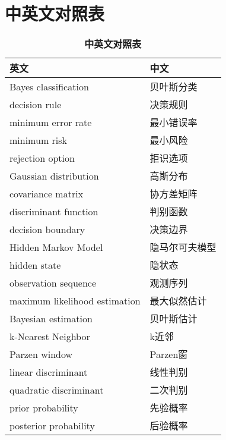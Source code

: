 \documentclass[UTF8]{report}
\theoremstyle{MyLineTheoremStyle} %
\theoremstyle{MyBlockTheoremStyle} %
\theoremstyle{MySubsubsectionStyle} %
\begin{document}
\section{中英文对照表}
\begin{multicols}{2}  

\begin{table}[H]
\centering
\caption{\textbf{中英文对照表}}
\begin{tabular}{ll}
\toprule
英文 & 中文 \\
\midrule
Bayes classification & 贝叶斯分类 \\
decision rule & 决策规则 \\
minimum error rate & 最小错误率 \\
minimum risk & 最小风险 \\
rejection option & 拒识选项 \\
Gaussian distribution & 高斯分布 \\
covariance matrix & 协方差矩阵 \\
discriminant function & 判别函数 \\
decision boundary & 决策边界 \\
Hidden Markov Model & 隐马尔可夫模型 \\
hidden state & 隐状态 \\
observation sequence & 观测序列 \\
maximum likelihood estimation & 最大似然估计 \\
Bayesian estimation & 贝叶斯估计 \\
k-Nearest Neighbor & k近邻 \\
Parzen window & Parzen窗 \\
linear discriminant & 线性判别 \\
quadratic discriminant & 二次判别 \\
prior probability & 先验概率 \\
posterior probability & 后验概率 \\
\bottomrule
\end{tabular}
\end{table}

\end{multicols}
\end{document}
